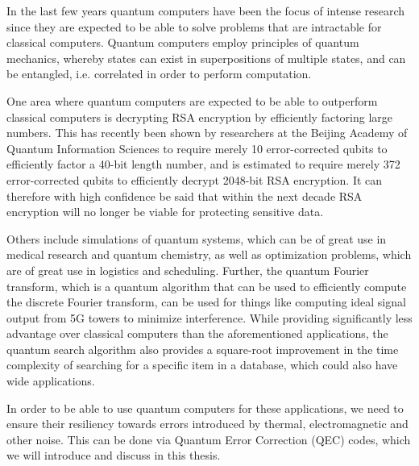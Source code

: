 In the last few years quantum computers have been the focus of intense research
since they are expected to be able to solve problems that are intractable for
classical computers. 
Quantum computers employ principles of quantum mechanics, whereby states can exist
in superpositions of multiple states, and can be entangled, i.e. correlated
in order to perform computation.

One area where quantum computers are expected to be able to outperform classical
computers is decrypting RSA encryption by efficiently factoring large 
numbers. 
This has recently been shown by researchers at the Beijing
Academy of Quantum Information Sciences to require merely 10 error-corrected
 qubits \cite{beijing} to efficiently factor a 40-bit length number,
and is estimated to require merely 372 error-corrected qubits to efficiently decrypt
2048-bit RSA encryption.
It can therefore with high confidence be said that within the next decade
RSA encryption will no longer be viable for protecting sensitive data.

Others include simulations of quantum systems, which can be of great use in
medical research and quantum chemistry, as well as optimization problems, which
are of great use in logistics and scheduling.
Further, the quantum Fourier transform, which is a quantum algorithm that
can be used to efficiently compute the discrete Fourier transform, can be used for 
things like computing ideal signal output from 5G towers to minimize interference.
While providing significantly less advantage over classical computers than the 
aforementioned applications, the quantum search algorithm also provides a 
square-root improvement in the time complexity of searching for a specific item in 
a database, which could also have wide applications.

In order to be able to use quantum computers for these applications, we need to
ensure their resiliency towards errors introduced by thermal, electromagnetic and 
other noise. 
This can be done via Quantum Error Correction (QEC) codes, which we will introduce
and discuss in this thesis.
